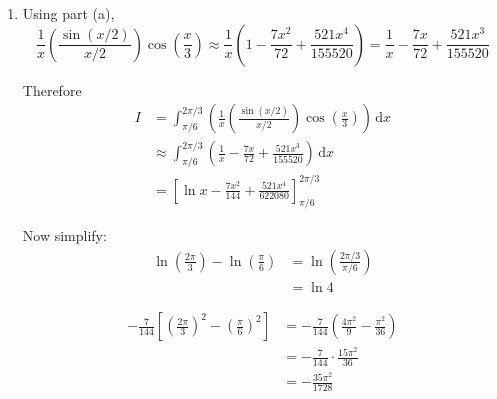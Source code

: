 \documentclass[leqno]{article}
\begin{document}
\begin{enumerate}[
  label=\textbf{\arabic*.},
  leftmargin=*,
  topsep=0pt,
  partopsep=0pt,
  parsep=0pt
]
\begin{tcolorbox}[colback=white, colframe=scarlet, title={\textbf{Solution}}, breakable, grow to left by=6mm, grow to right by=10mm]
\begin{enumerate}[label=\textbf{(\alph*)}]
Also, with \(u=\dfrac{x}{3}\),
\begin{align*}
\cos\left(\frac{x}{3}\right)
&=1-\frac{1}{2!}\left(\frac{x}{3}\right)^2+\frac{1}{4!}\left(\frac{x}{3}\right)^4+\cdots \\
&=1-\frac{x^2}{18}+\frac{x^4}{1944}+\cdots
\end{align*}

Now multiply the two series, keeping terms up to \(x^4\):
\begin{align*}
\left(\frac{\sin(x/2)}{x/2}\right)\cos\left(\frac{x}{3}\right)
&=\left(1-\frac{x^2}{24}+\frac{x^4}{1920}\right)\left(1-\frac{x^2}{18}+\frac{x^4}{1944}\right) \\
&=1-\left(\frac{1}{24}+\frac{1}{18}\right)x^2
+\left(\frac{1}{1920}+\frac{1}{1944}+\frac{1}{24}\cdot\frac{1}{18}\right)x^4+\cdots \\
&=1-\frac{7x^2}{72}+\frac{521x^4}{155520}+\cdots
\end{align*}

Hence
\[
\left(\frac{\sin(x/2)}{x/2}\right)\cos\left(\frac{x}{3}\right)
=1-\frac{7x^2}{72}+\frac{521x^4}{155520}+O(x^6)
\]

  \item Using part (a),
\[
\frac{1}{x}\left(\frac{\sin(x/2)}{x/2}\right)\cos\left(\frac{x}{3}\right)
\approx \frac{1}{x}\left(1-\frac{7x^2}{72}+\frac{521x^4}{155520}\right)
= \frac{1}{x}-\frac{7x}{72}+\frac{521x^3}{155520}
\]

Therefore
\begin{align*}
I&=\int_{\pi/6}^{2\pi/3}\left(\frac{1}{x}\left(\frac{\sin(x/2)}{x/2}\right)\cos\left(\frac{x}{3}\right)\right)\,\mathrm{d}x \\
&\approx \int_{\pi/6}^{2\pi/3}\left(\frac{1}{x}-\frac{7x}{72}+\frac{521x^3}{155520}\right)\,\mathrm{d}x \\
&= \left[\ln x-\frac{7x^2}{144}+\frac{521x^4}{622080}\right]_{\pi/6}^{2\pi/3}
\end{align*}

Now simplify:
\begin{align*}
\ln\left(\frac{2\pi}{3}\right)-\ln\left(\frac{\pi}{6}\right)
&=\ln\left(\frac{2\pi/3}{\pi/6}\right) \\
&=\ln 4
\end{align*}

\begin{align*}
-\frac{7}{144}\left[\left(\frac{2\pi}{3}\right)^2-\left(\frac{\pi}{6}\right)^2\right]
&=-\frac{7}{144}\left(\frac{4\pi^2}{9}-\frac{\pi^2}{36}\right) \\
&=-\frac{7}{144}\cdot\frac{15\pi^2}{36} \\
&=-\frac{35\pi^2}{1728}
\end{align*}


\end{enumerate}
\end{tcolorbox}
\end{enumerate}
\end{document}
